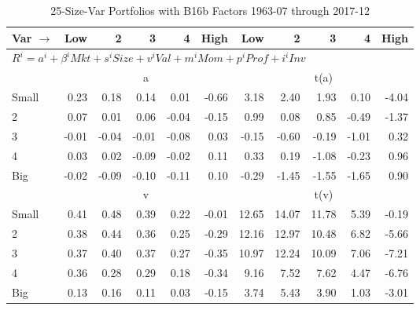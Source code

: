 
\begin{table}[!ht]
\footnotesize
\centering
\caption{25-Size-Var Portfolios with B16b Factors 1963-07 through 2017-12}
\begin{tabular}{lrrrrrrrrrr}
  \toprule
    Var $\rightarrow$ & Low & 2 & 3 & 4 & High & Low & 2 & 3 & 4 & High \\ 
  \midrule
  \multicolumn{11}{l}{$R^i=a^i+\beta^iMkt+s^iSize+v^iVal+m^iMom+p^iProf+i^iInv$} \\

  
    
      & \multicolumn{5}{c}{a} & \multicolumn{5}{c}{t(a)}
    
    \\
      \cmidrule(r){2-6} \cmidrule(r){7-11}

    Small   & 0.23  & 0.18  & 0.14  & 0.01  & -0.66  & 3.18  & 2.40  & 1.93  & 0.10  & -4.04  \\
         2  & 0.07  & 0.01  & 0.06  & -0.04  & -0.15  & 0.99  & 0.08  & 0.85  & -0.49  & -1.37  \\
         3  & -0.01  & -0.04  & -0.01  & -0.08  & 0.03  & -0.15  & -0.60  & -0.19  & -1.01  & 0.32  \\
         4  & 0.03  & 0.02  & -0.09  & -0.02  & 0.11  & 0.33  & 0.19  & -1.08  & -0.23  & 0.96  \\
    Big     & -0.02  & -0.09  & -0.10  & -0.11  & 0.10  & -0.29  & -1.45  & -1.55  & -1.65  & 0.90  \\

  
    
      & \multicolumn{5}{c}{v} & \multicolumn{5}{c}{t(v)}
    
    \\
      \cmidrule(r){2-6} \cmidrule(r){7-11}

    Small   & 0.41  & 0.48  & 0.39  & 0.22  & -0.01  & 12.65  & 14.07  & 11.78  & 5.39  & -0.19  \\
         2  & 0.38  & 0.44  & 0.36  & 0.25  & -0.29  & 12.16  & 12.97  & 10.48  & 6.82  & -5.66  \\
         3  & 0.37  & 0.40  & 0.37  & 0.27  & -0.35  & 10.97  & 12.24  & 10.09  & 7.06  & -7.21  \\
         4  & 0.36  & 0.28  & 0.29  & 0.18  & -0.34  & 9.16  & 7.52  & 7.62  & 4.47  & -6.76  \\
    Big     & 0.13  & 0.16  & 0.11  & 0.03  & -0.15  & 3.74  & 5.43  & 3.90  & 1.03  & -3.01  \\

  
    

\end{tabular}
\end{table}
